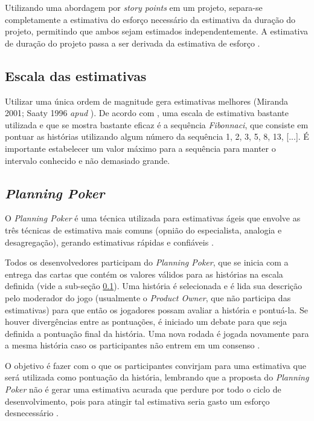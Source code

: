     Utilizando uma abordagem por \textit{story points} em um projeto, separa-se completamente a estimativa do esforço
    necessário da estimativa da duração do projeto, permitindo que ambos sejam estimados independentemente. A estimativa de
    duração do projeto passa a ser derivada da estimativa de esforço \cite{cohn06}.
 
  \subsection{Escala das estimativas}
  \label{estimation_scales}
    
      Utilizar uma única ordem de magnitude gera estimativas melhores (Miranda 2001; Saaty 1996 \textit{apud} \cite{cohn06}).
      De acordo com , uma escala de estimativa bastante utilizada e que se mostra bastante eficaz é a
      sequência \textit{Fibonnaci}, que consiste em pontuar as histórias utilizando algum número da 
      sequência 1, 2, 3, 5, 8, 13, [...]. É importante estabelecer um valor máximo para a sequência para manter o intervalo
      conhecido e não demasiado grande.
    
  \subsection{\textit{Planning Poker}}
  
    O \textit{Planning Poker} é uma técnica utilizada para estimativas ágeis que envolve as três técnicas de estimativa
    mais comuns (opnião do especialista, analogia e desagregação), gerando estimativas rápidas e confiáveis \cite{cohn06}.
    
    Todos os desenvolvedores participam do \textit{Planning Poker}, que se inicia com a entrega das cartas que contém os 
    valores válidos para as histórias na escala definida (vide a sub-seção \ref{estimation_scales}).
    Uma história é selecionada e é lida sua descrição pelo moderador
    do jogo (usualmente o \textit{Product Owner}, que não participa das estimativas) para que então os jogadores possam 
    avaliar a história e pontuá-la. Se houver divergências entre as pontuações, é iniciado um debate para que seja definida
    a pontuação final da história. Uma nova rodada é jogada novamente para a mesma história caso os participantes não
    entrem em um consenso \cite{grenning02}.
    
    O objetivo é fazer com o que os participantes convirjam para uma estimativa que será utilizada como pontuação da
    história, lembrando que a proposta do \textit{Planning Poker} não é gerar uma estimativa acurada que perdure por
    todo o ciclo de desenvolvimento, pois para atingir tal estimativa seria gasto um esforço 
    desnecessário \cite{cohn06} \cite{grenning02}.
    
